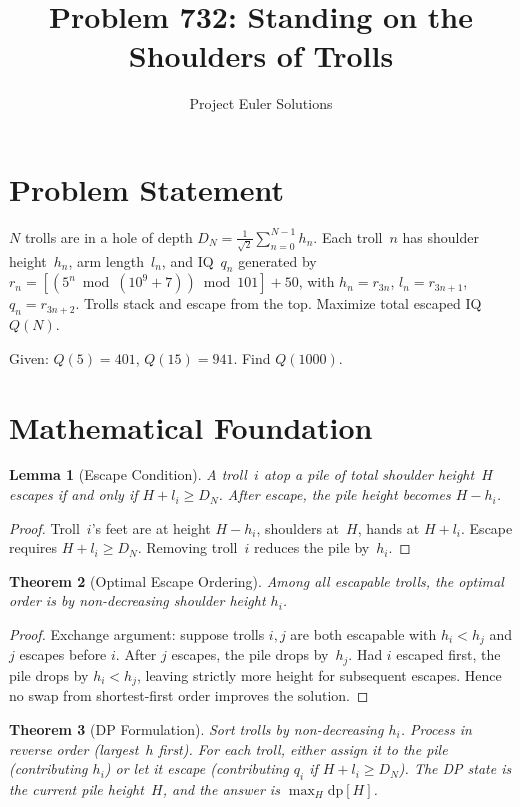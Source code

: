 \documentclass[11pt]{article}
\title{Problem 732: Standing on the Shoulders of Trolls}
\author{Project Euler Solutions}
\date{}
\newtheorem{theorem}{Theorem}
\newtheorem{lemma}[theorem]{Lemma}
\begin{document}
\maketitle

\section{Problem Statement}

$N$ trolls are in a hole of depth $D_N = \frac{1}{\sqrt{2}}\sum_{n=0}^{N-1} h_n$. Each troll~$n$ has shoulder height~$h_n$, arm length~$l_n$, and IQ~$q_n$ generated by $r_n = [(5^n \bmod (10^9+7)) \bmod 101] + 50$, with $h_n = r_{3n}$, $l_n = r_{3n+1}$, $q_n = r_{3n+2}$. Trolls stack and escape from the top. Maximize total escaped IQ $Q(N)$.

Given: $Q(5) = 401$, $Q(15) = 941$. Find $Q(1000)$.

\section{Mathematical Foundation}

\begin{lemma}[Escape Condition]
A troll~$i$ atop a pile of total shoulder height~$H$ escapes if and only if $H + l_i \ge D_N$. After escape, the pile height becomes $H - h_i$.
\end{lemma}

\begin{proof}
Troll~$i$'s feet are at height $H - h_i$, shoulders at~$H$, hands at $H + l_i$. Escape requires $H + l_i \ge D_N$. Removing troll~$i$ reduces the pile by~$h_i$.
\end{proof}

\begin{theorem}[Optimal Escape Ordering]
Among all escapable trolls, the optimal order is by non-decreasing shoulder height $h_i$.
\end{theorem}

\begin{proof}
Exchange argument: suppose trolls $i, j$ are both escapable with $h_i < h_j$ and $j$ escapes before $i$. After $j$ escapes, the pile drops by~$h_j$. Had $i$ escaped first, the pile drops by $h_i < h_j$, leaving strictly more height for subsequent escapes. Hence no swap from shortest-first order improves the solution.
\end{proof}

\begin{theorem}[DP Formulation]
Sort trolls by non-decreasing $h_i$. Process in reverse order (largest~$h$ first). For each troll, either assign it to the pile (contributing $h_i$) or let it escape (contributing $q_i$ if $H + l_i \ge D_N$). The DP state is the current pile height~$H$, and the answer is $\max_H \mathrm{dp}[H]$.
\end{theorem}
\end{document}
